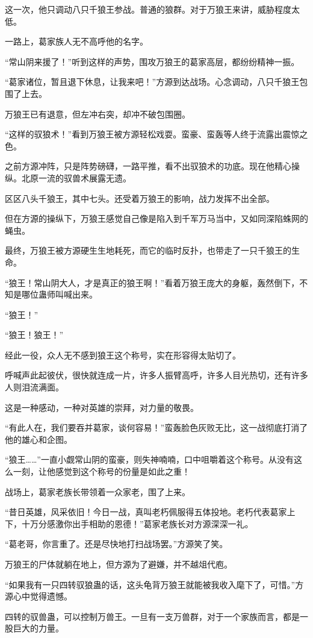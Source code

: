 \begin{this_body}
这一次，他只调动八只千狼王参战。普通的狼群。对于万狼王来讲，威胁程度太低。

一路上，葛家族人无不高呼他的名字。

“常山阴来援了！”听到这样的声势，围攻万狼王的葛家高层，都纷纷精神一振。

“葛家诸位，暂且退下休息，让我来吧！”方源到达战场。心念调动，八只千狼王包围了上去。

万狼王已有退意，但左冲右突，却冲不破包围圈。

“这样的驭狼术！”看到万狼王被方源轻松戏耍。蛮豪、蛮轰等人终于流露出震惊之色。

之前方源冲阵，只是阵势磅礴，一路平推，看不出驭狼术的功底。现在他精心操纵。北原一流的驭兽术展露无遗。

区区八头千狼王，其中七头。还受着万狼王的影响，战力发挥不出全部。

但在方源的操纵下，万狼王感觉自己像是陷入到千军万马当中，又如同深陷蛛网的蝇虫。

最终，万狼王被方源硬生生地耗死，而它的临时反扑，也带走了一只千狼王的生命。

“狼王！常山阴大人，才是真正的狼王啊！”看着万狼王庞大的身躯，轰然倒下，不知是哪位蛊师叫喊出来。

“狼王！”

“狼王！狼王！”

经此一役，众人无不感到狼王这个称号，实在形容得太贴切了。

呼喊声此起彼伏，很快就连成一片，许多人振臂高呼，许多人目光热切，还有许多人则泪流满面。

这是一种感动，一种对英雄的崇拜，对力量的敬畏。

“有此人在，我们要吞并葛家，谈何容易！”蛮轰脸色灰败无比，这一战彻底打消了他的雄心和企图。

“狼王……”一直小觑常山阴的蛮豪，则失神喃喃，口中咀嚼着这个称号。从没有这么一刻，让他感觉到这个称号的份量是如此之重！

战场上，葛家老族长带领着一众家老，围了上来。

“昔日英雄，风采依旧！今日一战，真叫老朽佩服得五体投地。老朽代表葛家上下，十万分感激你出手相助的恩德！”葛家老族长对方源深深一礼。

“葛老哥，你言重了。还是尽快地打扫战场罢。”方源笑了笑。

万狼王的尸体就躺在地上，但方源为了避嫌，并不越俎代庖。

“如果我有一只四转驭狼蛊的话，这头龟背万狼王就能被我收入麾下了，可惜。”方源心中觉得遗憾。

四转的驭兽蛊，可以控制万兽王。一旦有一支万兽群，对于一个家族而言，都是一股巨大的力量。


\end{this_body}

